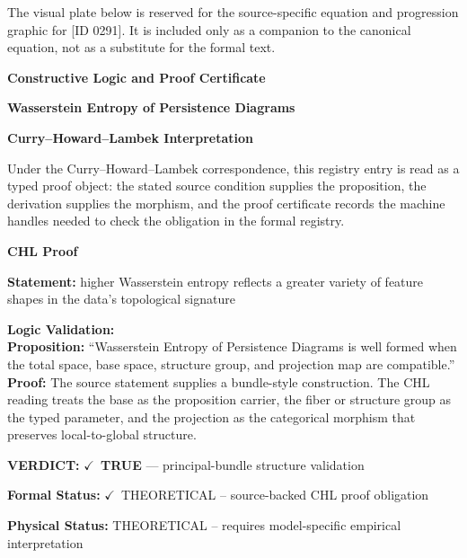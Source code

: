 \begingroup\footnotesize\sloppy
The visual plate below is reserved for the source-specific equation and progression graphic for [ID 0291]. It is included only as a companion to the canonical equation, not as a substitute for the formal text.
\par\endgroup
\ifTZPDarkEdition
{}
\fi

\clearpage
\begingroup\tzpsupportsetup
\noindent\textbf{\fontsize{10.8pt}{12.8pt}\selectfont [ID 0291] Constructive Logic and Proof Certificate}\par
\noindent\textbf{\fontsize{10pt}{12pt}\selectfont Wasserstein Entropy of Persistence Diagrams}\par
\vspace{0.45em}
\begingroup
\footnotesize
\setlength{\parskip}{0.22em}
\setlength{\parindent}{0pt}
\noindent\textbf{Curry--Howard--Lambek Interpretation}\par
Under the Curry--Howard--Lambek correspondence, this registry entry is read as a typed proof
object: the stated source condition supplies the proposition, the derivation supplies the
morphism, and the proof certificate records the machine handles needed to check the obligation
in the formal registry.

\vspace{0.45em}
\noindent\textbf{CHL Proof}\par
\textbf{Statement:} higher Wasserstein entropy reflects a greater variety of feature shapes in the data's
topological signature

\textbf{Logic Validation:}\\
\textbf{Proposition:} ``Wasserstein Entropy of Persistence Diagrams is well formed when the total space, base
space, structure group, and projection map are compatible.''\\
\textbf{Proof:} The source statement supplies a bundle-style construction. The CHL reading treats the
base as the proposition carrier, the fiber or structure group as the typed parameter,
and the projection as the categorical morphism that preserves local-to-global structure.

\textbf{VERDICT:} \ensuremath{\checkmark}\ \textbf{TRUE} --- principal-bundle structure validation

\textbf{Formal Status:} \ensuremath{\checkmark}\ THEORETICAL -- source-backed CHL proof obligation

\textbf{Physical Status:} THEORETICAL -- requires model-specific empirical interpretation
\par\vspace{0.45em}
\par
\ifTZPDarkEdition
{}
\fi
\endgroup
\endgroup
